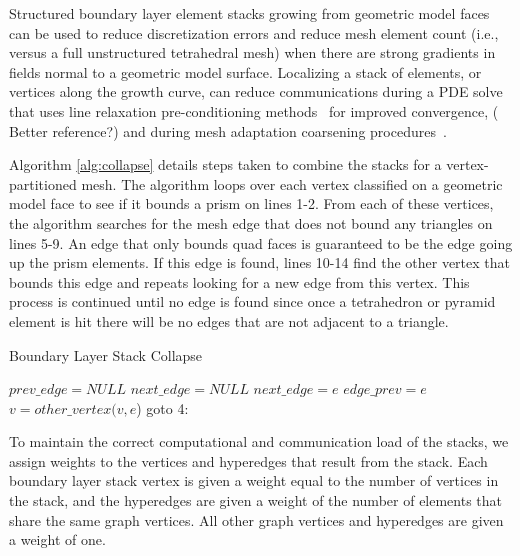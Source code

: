 \documentclass[conference]{IEEEtran}
\begin{document}
Structured boundary layer element stacks growing from geometric model faces can
be used to reduce discretization errors and reduce mesh element count (i.e., versus
a full unstructured tetrahedral mesh) when there are strong gradients in
fields normal to a geometric model surface.
Localizing a stack of elements, or vertices along the growth curve, can reduce
communications during a PDE solve that uses line relaxation pre-conditioning
methods~\cite{wesseling2001311} for improved convergence, ({\color{red} Better
reference?}) and during mesh adaptation coarsening
procedures~\cite{chitale-aiaa14,Sahn07,loseille20093d}.

Algorithm \ref{alg:collapse} details steps taken to
combine the stacks for a vertex-partitioned mesh. The algorithm loops over each
vertex classified on a geometric
model face to see if it bounds a prism on lines 1-2. From each of these vertices, the
algorithm searches for the mesh edge that does not bound any triangles on lines 5-9. An edge
that only bounds quad faces is guaranteed to be the edge going up the prism elements. If
this edge is found, lines 10-14 find the other vertex that bounds this edge and repeats
looking for a new edge from this vertex. This process is continued until no edge is found
since once a tetrahedron or pyramid element is hit there will be no edges that are
not adjacent to a triangle.
\begin{algorithm}
  \caption{Boundary Layer Stack Collapse}
  \label{alg:collapse}
  \small
  \begin{algorithmic}[1]
    \State $prev\_edge = NULL$
    \State $next\_edge = NULL$
    \State $next\_edge = e$
    \EndIf
    \EndFor
    \State $edge\_prev = e$
    \State $v = other\_vertex(v,e$)
    \State goto 4:
    \EndIf
    \EndIf
    \EndFor
  \end{algorithmic}
\end{algorithm}

To maintain the correct computational and communication load of the stacks,
we assign weights to the vertices and hyperedges that result from the stack. Each boundary layer
stack vertex is given a weight equal to the number of vertices in the stack, and the hyperedges
are given a weight of the number of elements that share the same graph vertices. All other
graph vertices and hyperedges are given a weight of one.
\end{document}
